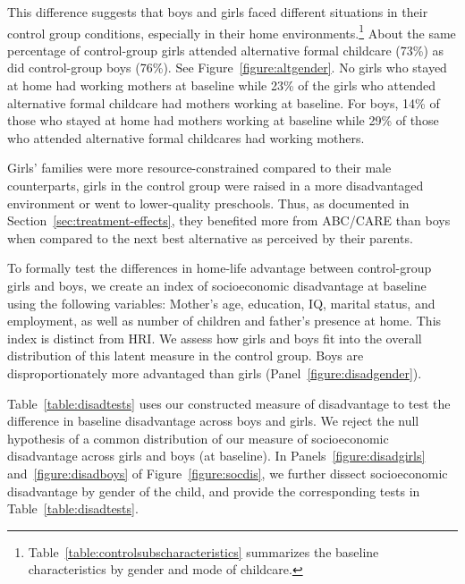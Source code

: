 This difference suggests that boys and girls faced different situations in their control group conditions, especially in their home environments.\footnote{Table~\ref{table:controlsubscharacteristics} summarizes the baseline characteristics by gender and mode of childcare.} About the same percentage of control-group girls attended alternative formal childcare (73\%) as did control-group boys (76\%). See Figure~\ref{figure:altgender}. No girls who stayed at home had working mothers at baseline while 23\% of the girls who attended alternative formal childcare had mothers working at baseline. For boys, 14\% of those who stayed at home had mothers working at baseline while 29\% of those who attended alternative formal childcares had working mothers.

Girls' families were more resource-constrained compared to their male counterparts, girls in the control group were raised in a more disadvantaged environment or went to lower-quality preschools. Thus, as documented in Section~\ref{sec:treatment-effects}, they benefited more from ABC/CARE than boys when compared to the next best alternative as perceived by their parents.


To formally test the differences in home-life advantage between control-group girls and boys, we create an index of socioeconomic disadvantage at baseline using the following variables: Mother's age, education, IQ, marital status, and employment, as well as number of children and father's presence at home. This index is distinct from HRI. We assess how girls and boys fit into the overall distribution of this latent measure in the control group. Boys are disproportionately more advantaged than girls (Panel~\ref{figure:disadgender}).

Table~\ref{table:disadtests} uses our constructed measure of disadvantage to test the difference in baseline disadvantage across boys and girls. We reject the null hypothesis of a common distribution of our measure of socioeconomic disadvantage across girls and boys (at baseline). In Panels~\ref{figure:disadgirls} and~\ref{figure:disadboys} of Figure~\ref{figure:socdis}, we further dissect socioeconomic disadvantage by gender of the child, and provide the corresponding tests in Table~\ref{table:disadtests}.

